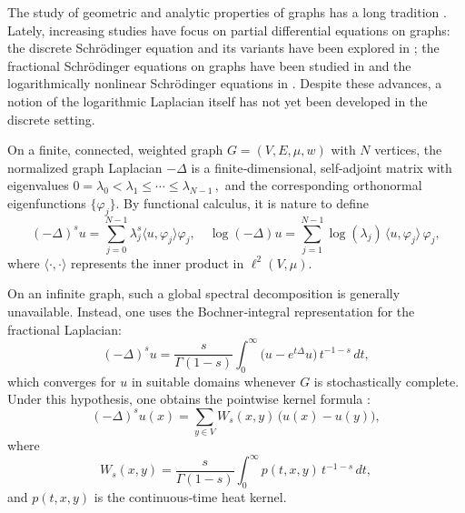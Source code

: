 \documentclass[reqno,12pt]{amsart}
\numberwithin{equation}{section}
\begin{document}
The study of geometric and analytic properties of graphs has a long tradition \cite{chung1997spectral,chung1999coverings,bauer2017sharp,wojciechowski2009heat,wojciechowski2008stochastic,horn2019volume,bauer2015li}. Lately, increasing studies have focus on partial differential equations on graphs: the discrete Schrödinger equation and its variants have been explored in \cite{hua2023existence,yang2024normalized,grigor2017existence,zhang2018convergence}; the fractional Schrödinger equations on graphs have been studied in \cite{zhang2024fractional1,zhang2024fractional,ciaurri2018nonlocal} and the logarithmically nonlinear Schrödinger equations in \cite{chang2023convergence,he2024existence,ardila2017existence,chang2023ground}.  Despite these advances, a notion of the logarithmic Laplacian itself has not yet been developed in the discrete setting.  

 On a finite, connected, weighted graph \(G=(V,E,\mu,w)\) with $N$ vertices, the normalized graph Laplacian \(-\Delta\) is a finite‐dimensional, self-adjoint matrix with eigenvalues $0=\lambda_0<\lambda_1\le\cdots\le\lambda_{N-1}\,,$ 
and the corresponding orthonormal eigenfunctions \(\{\varphi_j\}\).  By functional calculus, it is nature to define $$(-\Delta)^s u
=\sum_{j=0}^{N-1}\lambda_j^s\langle u,\varphi_j\rangle \varphi_j,\quad\log(-\Delta)u
=\sum_{j=1}^{N-1} \log(\lambda_j)\,\langle u,\varphi_j\rangle\,\varphi_j,$$
where $\langle \cdot,\cdot\rangle$ represents the inner product in $\ell^2\left(V,\mu\right)$.

On an infinite graph, such a global spectral decomposition is generally unavailable.  Instead, one uses the Bochner‐integral representation for the fractional Laplacian:
\[
(-\Delta)^s u
=\frac{s}{\Gamma(1-s)}\int_{0}^{\infty}\bigl(u-e^{t\Delta}u \bigr)\,t^{-1-s}\,dt,
\] 
which converges for \(u\) in suitable domains whenever \(G\) is stochastically complete.  Under this hypothesis, one obtains the pointwise kernel formula \cite{zhang2024fractional1,wang2023eigenvalue}:
\[
(-\Delta)^s u(x)
=\sum_{y\in V}W_s(x,y)\,\bigl(u(x)-u(y)\bigr),
\]
where
\[
W_s(x,y)
=\frac{s}{\Gamma(1-s)}\int_{0}^{\infty}p(t,x,y)\,t^{-1-s}\,dt,
\]
and \(p(t,x,y)\) is the continuous‐time heat kernel.  
\end{document}
